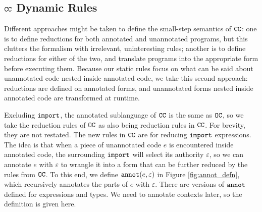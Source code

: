 \subsection{$\mathtt{CC}$ Dynamic Rules}

Different approaches might be taken to define the small-step semantics of $\mathtt{CC}$: one is to define reductions for both annotated and unannotated programs, but this clutters the formalism with irrelevant, uninteresting rules; another is to define reductions for either of the two, and translate programs into the appropriate form before executing them. Because our static rules focus on what can be said about unannotated code nested inside annotated code, we take this second approach: reductions are defined on annotated forms, and unannotated forms nested inside annotated code are transformed at runtime.

Excluding $\mathtt{import}$, the annotated sublanguage of $\mathtt{CC}$ is the same as $\mathtt{OC}$, so we take the reduction rules of $\mathtt{OC}$ as also being reduction rules in $\mathtt{CC}$. For brevity, they are not restated. The new rules in $\mathtt{CC}$ are for reducing $\mathtt{import}$ expressions. The idea is that when a piece of unannotated code $e$ is encountered inside annotated code, the surrounding $\mathtt{import}$ will select its authority $\varepsilon$, so we can annotate $e$ with $\varepsilon$ to wrangle it into a form that can be further reduced by the rules from $\mathtt{OC}$. To this end, we define $\mathtt{annot}(e, \varepsilon)$ in Figure \ref{fig:annot_defn}, which recursively annotates the parts of $e$ with $\varepsilon$. There are versions of $\mathtt{annot}$ defined for expressions and types. We need to annotate contexts later, so the definition is given here.

